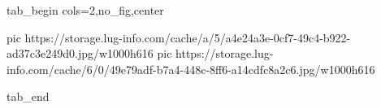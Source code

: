  
 
 
 
 


\ifcmt
  tab_begin cols=2,no_fig,center

     pic https://storage.lug-info.com/cache/a/5/a4e24a3e-0cf7-49c4-b922-ad37c3e249d0.jpg/w1000h616%
		 pic https://storage.lug-info.com/cache/6/0/49e79adf-b7a4-448c-8ff6-a14cdfc8a2c6.jpg/w1000h616%

  tab_end
\fi
